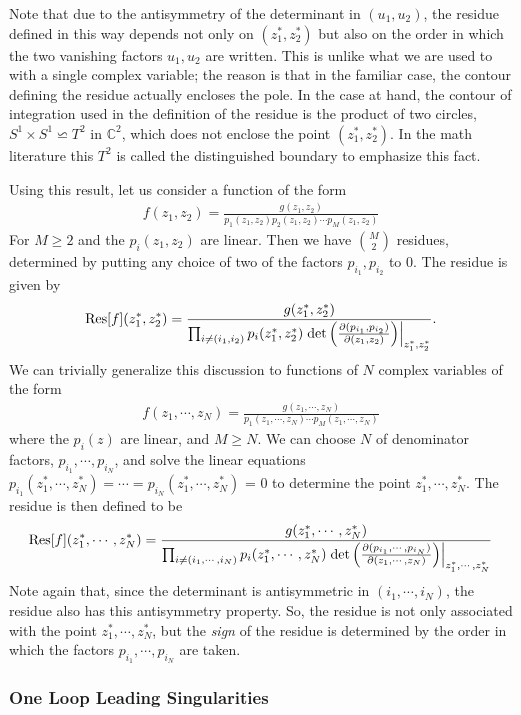 \documentclass[12pt]{article}
\newcommand{\del}{\partial}
\newcommand{\be}{\begin{eqnarray}}
\newcommand{\ee}{\end{eqnarray}}
\begin{document}
Note that due to the antisymmetry of the determinant in $(u_1,u_2)$, the residue defined in this way depends not only on $(z^*_1,z^*_2)$ but also on the order in which the two vanishing factors $u_1,u_2$ are written.
This is unlike what we are used to with a single complex variable; the reason is that in the familiar case, the contour defining the residue actually encloses the pole. In the case at hand, the contour of integration used in the definition of the residue is the product of two circles, $S^1\times S^1\backsimeq T^2$ in $\mathbb{C}^2$, which does not enclose the point $(z_1^*,z_2^*)$. In the math literature this $T^2$ is called the distinguished boundary to emphasize this fact.

Using this result, let us consider a function of the form
\be
f(z_1,z_2) = \frac{g(z_1,z_2)}{p_1(z_1,z_2) p_2(z_1,z_2) \cdots p_M(z_1,z_2)}
\ee
For $M \ge 2$ and the $p_i(z_1,z_2)$ are linear. Then we have $M \choose 2$ residues, determined by putting any choice of two of the factors $p_{i_1},p_{i_2}$ to 0. The residue is given by
\be
{\rm Res}[f](z_1^*,z_2^*) =  \frac{g(z_1^*,z_2^*)}{\prod_{i \neq (i_1,i_2)} p_i(z^*_1, z^*_2) \left. {\rm det}\left(\frac{\del(p_{i_1},p_{i_2})}{\del (z_1,z_2)}\right)\right|_{z_1^*,z_2^*}} .
\ee
We can trivially generalize this discussion to functions of $N$ complex variables of the form
\be
f(z_1, \cdots, z_N) = \frac{g(z_1,\cdots,z_N)}{p_1(z_1, \cdots, z_N) \cdots p_M(z_1,\cdots,z_N)}
\ee
where the $p_i(z)$ are linear, and $M \ge N$. We can choose $N$ of denominator factors, $p_{i_1},\cdots,p_{i_N}$, and solve the linear equations $p_{i_1}(z^*_1, \cdots, z^*_N) = \cdots = p_{i_N}(z^*_1,\cdots,z^*_N)$ = 0 to determine the point $z^*_1, \cdots, z^*_N$. The residue is then defined to be
\be
{\rm Res}[f](z^*_1,\cdots,z^*_N) = \frac{g(z_1^*,\cdots,z_N^*)}{\prod_{i \neq(i_1,\cdots,i_N)} p_i(z_1^*,\cdots,z^*_N) \left. {\rm det}\left(\frac{\del(p_{i_1}, \cdots,p_{i_N})}{\del (z_1, \cdots, z_N)}\right)\right|_{z_1^*,\cdots, z_N^*}}
\ee
Note again that, since the determinant is antisymmetric in $(i_1,\cdots,i_N)$, the residue also has this antisymmetry property. So, the residue is not only associated with the point $z^*_1,\cdots,z^*_N$, but the {\it sign} of the residue is determined by the order in which the factors $p_{i_1},\cdots,p_{i_N}$ are taken.

\subsubsection{One Loop Leading Singularities}
\end{document}
